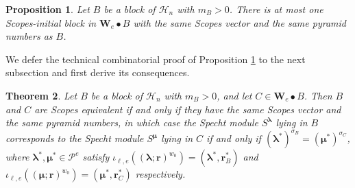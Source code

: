 \documentclass[11pt,a4paper,reqno]{amsart}
\numberwithin{equation}{section}
\theoremstyle{plain}
\newtheorem{thm}{Theorem}[section]
\newtheorem{prop}[thm]{Proposition}
\theoremstyle{definition}
\theoremstyle{remark}
\numberwithin{equation}{section}
\newcommand{\bl}{\boldsymbol{\lambda}}
\newcommand{\bm}{\boldsymbol{\mu}}
\newcommand{\br}{\mathbf{r}}
\newcommand{\HH}{\mathcal{H}}
\newcommand{\Sp}{S}
\newcommand{\PP}{\mathcal{P}}
\newcommand{\AW}{\mathbf{W}}
\newcommand{\DDot}[1]{\mathrel{\overset{#1}{\bullet}}}
\newcommand{\bij}{\iota}
\begin{document}
\begin{prop} \label{P:unique}
Let $B$ be a block of $\HH_n$ with $m_B > 0$.  There is at most one Scopes-initial block in $\AW_e \DDot{} B$ with the same Scopes vector and the same pyramid numbers as $B$.
\end{prop}

We defer the technical combinatorial proof of Proposition \ref{P:unique} to the next subsection and first derive its consequences.

\begin{thm} \label{T:Scopes}
Let $B$ be a block of $\HH_n$ with $m_B > 0$, and let $C \in \AW_e \DDot{} B$.  Then $B$ and $C$ are Scopes equivalent if and only if they have the same Scopes vector and the same pyramid numbers,
in which case the Specht module $\Sp^{\bl}$ lying in $B$ corresponds to the Specht module $\Sp^{\bm}$ lying in $C$ if and only if $(\bl^*)^{\sigma_B} = (\bm^*)^{\sigma_C}$, where
$\bl^*,\bm^* \in \PP^e$ satisfy $\bij_{\ell,e}((\bl;\br)^{w_0}) = (\bl^*,\br^*_B)$ and $\bij_{\ell,e}((\bm;\br)^{w_0}) = (\bm^*,\br^*_C)$ respectively.
\end{thm}
\end{document}
